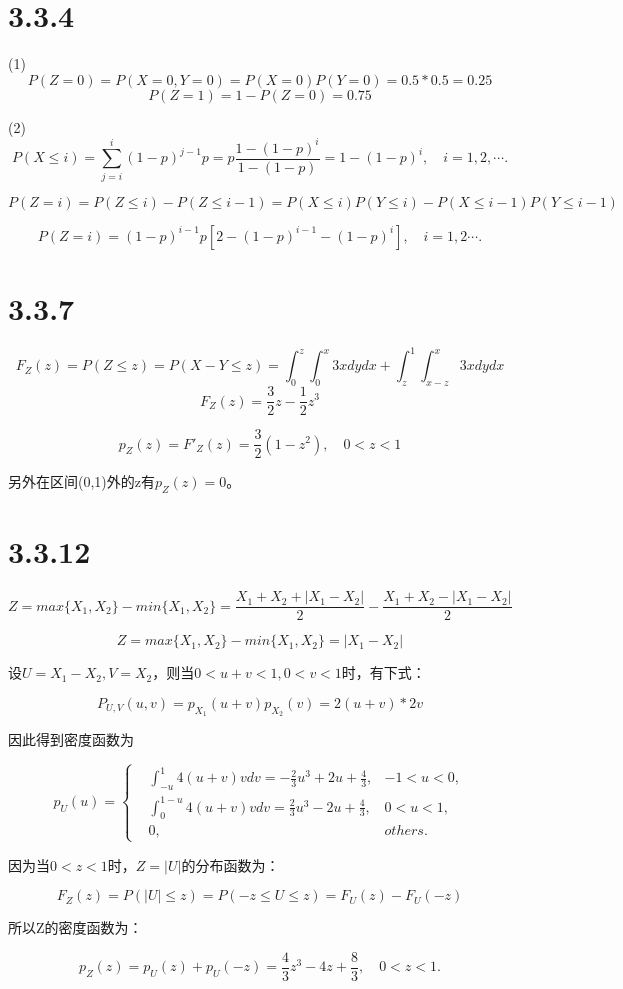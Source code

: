 \documentclass{article}
\begin{document}
\section{3.3.4}
(1)
$$P(Z=0)=P(X=0,Y=0)=P(X=0)P(Y=0)=0.5*0.5=0.25$$
$$P(Z=1)=1-P(Z=0)=0.75$$

(2)
$$P(X\leq i)=\sum^i_{j=i}(1-p)^{j-1}p=p\frac{1-(1-p)^i}{1-(1-p)}=1-(1-p)^i,\quad i=1,2,\cdots.$$

$$P(Z=i)=P(Z\leq i)-P(Z\leq i-1)=P(X\leq i)P(Y\leq i)-P(X\leq i-1)P(Y\leq i-1)$$

$$P(Z=i)=(1-p)^{i-1}p[2-(1-p)^{i-1}-(1-p)^i],\quad i=1,2\cdots.$$

\section{3.3.7}

$$F_Z(z)=P(Z\leq z)=P(X-Y\leq z)=\int^z_0\int^x_0 3xdydx+\int^1_z\int^x_{x-z} 3xdydx$$
$$F_Z(z)=\frac32z-\frac12z^3$$

$$p_Z(z)=F'_Z(z)=\frac32(1-z^2),\quad 0<z<1$$

另外在区间(0,1)外的z有$p_Z(z)=0$。

\section{3.3.12}
$$Z=max\{X_1,X_2\}-min\{X_1,X_2\}=\frac{X_1+X_2+|X_1-X_2|}{2}-\frac{X_1+X_2-|X_1-X_2|}{2}$$

$$Z=max\{X_1,X_2\}-min\{X_1,X_2\}=|X_1-X_2|$$

设$U=X_1-X_2,V=X_2$，则当$0<u+v<1,0<v<1$时，有下式：

$$P_{U,V}(u,v)=p_{X_1}(u+v)p_{X_2}(v)=2(u+v)*2v$$

因此得到密度函数为

\begin{equation}
p_U(u)=\left\{
\begin{aligned}
&\int^1_{-u}4(u+v)vdv=-\frac23u^3+2u+\frac43,&-1<u<0,\\
&\int^{1-u}_{0}4(u+v)vdv=\frac23u^3-2u+\frac43,&0<u<1,\\
&0,&others.
\end{aligned}
\right.
\end{equation}

因为当$0<z<1$时，$Z=|U|$的分布函数为：

$$F_Z(z)=P(|U|\leq z)=P(-z\leq U\leq z)=F_U(z)-F_U(-z)$$

所以Z的密度函数为：

$$p_Z(z)=p_U(z)+p_U(-z)=\frac43z^3-4z+\frac83,\quad 0<z<1.$$
\end{document}
